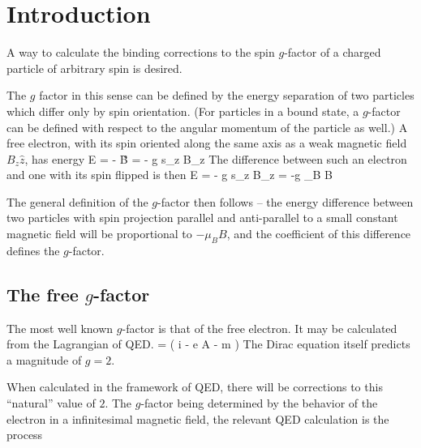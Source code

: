
\chapter{Introduction}


A way to calculate the binding corrections to the spin $g$-factor of a charged particle of arbitrary spin is desired.



The $g$ factor in this sense can be defined by the energy separation of two particles which differ only by spin orientation.  (For particles in a bound state, a $g$-factor can be defined with respect to the angular momentum of the particle as well.)  A free electron, with its spin oriented along the same axis as a weak magnetic field $B_z\hat{z}$, has energy
\beq
 E = - \gv{\mu} \cdot \v{B} = - g s_z B_z
\eeq
The difference between such an electron and one with its spin flipped is then
\beq
	\delta E = - g s_z B_z = -g \mu_B B
\eeq


The general definition of the $g$-factor then follows -- the energy difference between two particles with spin projection parallel and anti-parallel to a small constant magnetic field will be proportional to $ - \mu_B B$, and the coefficient of this difference defines the $g$-factor.


\section{The free $g$-factor}
The most well known $g$-factor is that of the free electron.  It may be calculated from the Lagrangian of QED.
\beq
	 = \Psibar \left( i \partial \cdot \gamma - e A \cdot \gamma - m \right ) \Psi
\eeq
The Dirac equation itself predicts a magnitude of $g=2$.  

When calculated in the framework of QED, there will be corrections to this ``natural'' value of $2$.  The $g$-factor being determined by the behavior of the electron in a infinitesimal magnetic field, the relevant QED calculation is the process

